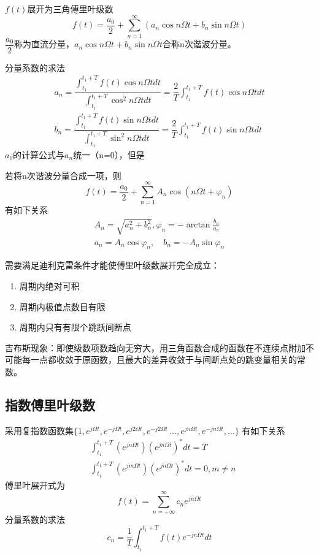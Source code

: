 $f(t)$展开为三角傅里叶级数
\begin{equation}
    f(t)=\dfrac{a_0}{2}+\sum_{n=1}^{\infty}(a_n \cos n \Omega t+b_n \sin n \Omega t)
\end{equation}
$\dfrac{a_0}{2}$称为直流分量，$a_n \cos n \Omega t+b_n \sin n \Omega t$合称n次谐波分量。

分量系数的求法
\begin{align}
    a_n=\dfrac{\int_{t_1}^{t_1+T} f(t)\cos n \Omega t dt}{\int_{t_1}^{t_1+T}\cos^2 n \Omega t dt}=\dfrac{2}{T}\int_{t_1}^{t_1+T} f(t)\cos n \Omega t dt\\
    b_n=\dfrac{\int_{t_1}^{t_1+T} f(t)\sin n \Omega t dt}{\int_{t_1}^{t_1+T}\sin^2 n \Omega t dt}=\dfrac{2}{T}\int_{t_1}^{t_1+T} f(t)\sin n \Omega t dt
\end{align}
$a_0$的计算公式与$a_n$统一（n=0），但是{\color{red}{代入级数表达式的时候记得除以2！}}

若将n次谐波分量合成一项，则
\begin{equation}
    f(t)=\dfrac{a_0}{2}+\sum_{n=1}^{\infty}A_n \cos (n \Omega t +\varphi_n)
\end{equation}
有如下关系
\begin{align}
    A_n=\sqrt{a_n^2+b_n^2},\varphi_n=-\arctan \frac{b_n}{a_n}\\
    a_n=A_n \cos \varphi_n,\quad b_n=-A_n \sin \varphi_n
\end{align}
{\color{blue}{$a_n$和$A_n$都是频率的偶函数，$b_n$和$\varphi_n$都是频率的奇函数}}

需要满足迪利克雷条件才能使傅里叶级数展开完全成立：
\begin{enumerate}
    \item 周期内绝对可积
    \item 周期内极值点数目有限
    \item 周期内只有有限个跳跃间断点
\end{enumerate}
吉布斯现象：即使级数项数趋向无穷大，用三角函数合成的函数在不连续点附加不可能每一点都收敛于原函数，且最大的差异收敛于与间断点处的跳变量相关的常数。
\subsection{指数傅里叶级数}
采用复指数函数集$\{ 1,e^{j\Omega t} ,e^{-j\Omega t},e^{j2\Omega t},e^{-j2\Omega t}\,\dots,e^{jn\Omega t},e^{-jn\Omega t},\dots \}$
有如下关系
\begin{align}
    &\int_{t_1}^{t_1+T}(e^{jn\Omega t})(e^{jn\Omega t})^* dt =T\\
    &\int_{t_1}^{t_1+T}(e^{jm\Omega t})(e^{jn\Omega t})^* dt =0,m \ne n
\end{align}
傅里叶展开式为
\begin{equation}
    f(t)=\sum_{n=-\infty}^{\infty}c_n e^{jn\Omega t}
\end{equation}
分量系数的求法
\begin{equation}
    c_n=\dfrac{1}{T}\int_{t_1}^{t_1+T}f(t)e^{-jn\Omega t}dt
\end{equation}
{}

